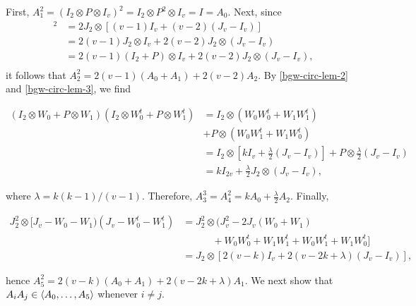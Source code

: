 \documentclass[../../../main]{subfiles}
\begin{document}
 First, $A_1^2 = (I_2 \otimes P \otimes I_v)^2 = I_2 \otimes P^2 \otimes I_v = I = A_0$. Next, since
 \begin{align*}
  [J_2 \otimes (J_v-I_v)]^2 &= 2J_2 \otimes [(v-1)I_v + (v-2)(J_v-I_v)] \\
  &= 2(v-1) J_2 \otimes I_v + 2(v-2) J_2 \otimes (J_v-I_v) \\
  &= 2(v-1)(I_2+P) \otimes I_v + 2(v-2)J_2 \otimes (J_v-I_v), \\
 \end{align*}
 it follows that $A_2^2 = 2(v-1)(A_0+A_1) + 2(v-2)A_2$. By \ref{bgw-circ-lem-2} and \ref{bgw-circ-lem-3}, we find
 \begin{small}
 \begin{align*}
  (I_2 \otimes W_0 + P \otimes W_1)(I_2 \otimes W_0^t + P \otimes W_1^t) &= I_2 \otimes (W_0W_0^t+W_1W_1^t) \\
  &+ P \otimes (W_0W_1^t + W_1W_0^t) \\
  &= I_2 \otimes [kI_v + \frac{\lambda}{2}(J_v-I_v)] + P \otimes \frac{\lambda}{2}(J_v-I_v) \\
  &= kI_{2v} + \frac{\lambda}{2}J_2 \otimes (J_v-I_v),
 \end{align*}
 \end{small}
 where $\lambda = k(k-1)/(v-1)$. Therefore, $A_3^3=A_4^2=kA_0+\frac{\lambda}{2}A_2$. Finally, 
 \begin{small}
 \begin{align*}
  J_2^2 \otimes [J_v-W_0-W_1)(J_v-W_0^t-W_1^t) &= J_2^2 \otimes (J_v^2 - 2J_v(W_0+W_1)\\&\quad\quad\quad+W_0W_0^t+W_1W_1^t+W_0W_1^t+W_1W_0^t] \\
  &= J_2 \otimes [2(v-k)I_v + 2(v-2k+\lambda)(J_v-I_v)],
 \end{align*}
 \end{small}
 hence $A_5^2 = 2(v-k)(A_0+A_1) + 2(v-2k+\lambda)A_1$. We next show that $A_iA_j \in \langle A_0,\dots,A_5\rangle$ whenever $i \neq j$.
 
\end{document}
